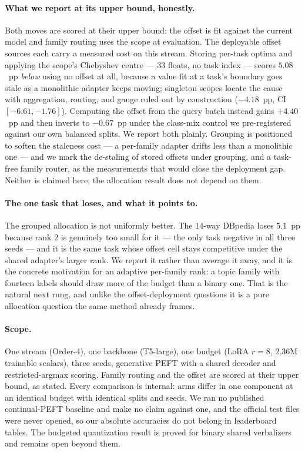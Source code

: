 \paragraph{What we report at its upper bound, honestly.}
Both moves are scored at their upper bound: the offset is fit against the current
model and family routing uses the scope at evaluation. The deployable offset sources
each carry a measured cost on this stream. Storing per-task optima and applying the
scope's Chebyshev centre --- $33$ floats, no task index --- scores $5.08$~pp
\emph{below} using no offset at all, because a value fit at a task's boundary goes
stale as a monolithic adapter keeps moving; singleton scopes locate the cause with
aggregation, routing, and gauge ruled out by construction ($-4.18$~pp, CI
$[-6.61,-1.76]$). Computing the offset from the query batch instead gains $+4.40$~pp
and then inverts to $-0.67$~pp under the class-mix control we pre-registered against
our own balanced splits. We report both plainly. Grouping is positioned to soften
the staleness cost --- a per-family adapter drifts less than a monolithic one --- and
we mark the de-staling of stored offsets under grouping, and a task-free family
router, as the measurements that would close the deployment gap. Neither is claimed
here; the allocation result does not depend on them.

\paragraph{The one task that loses, and what it points to.}
The grouped allocation is not uniformly better. The $14$-way DBpedia loses $5.1$~pp
because rank $2$ is genuinely too small for it --- the only task negative in all three
seeds --- and it is the same task whose offset cell stays competitive under the
shared adapter's larger rank. We report it rather than average it away, and it is the
concrete motivation for an adaptive per-family rank: a topic family with fourteen
labels should draw more of the budget than a binary one. That is the natural next
rung, and unlike the offset-deployment questions it is a pure allocation question the
same method already frames.

\paragraph{Scope.}
One stream (Order-4), one backbone (T5-large), one budget (LoRA $r{=}8$, $2.36$M
trainable scalars), three seeds, generative PEFT with a shared decoder and
restricted-argmax scoring. Family routing and the offset are scored at their upper
bound, as stated. Every comparison is internal: arms differ in one component at an
identical budget with identical splits and seeds. We ran no published continual-PEFT
baseline and make no claim against one, and the official test files were never
opened, so our absolute accuracies do not belong in leaderboard tables. The budgeted
quantization result is proved for binary shared verbalizers and remains open beyond
them.
